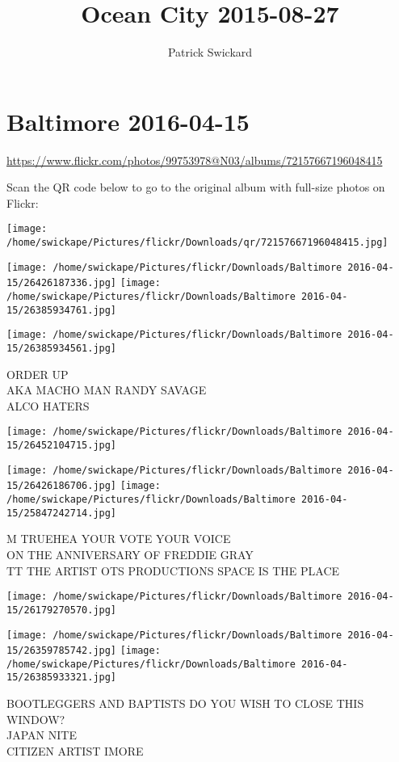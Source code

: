 \documentclass[10pt,letterpaper]{article}
\title{Ocean City 2015-08-27}
\author{Patrick Swickard}
\date{}
\begin{document}
\section*{Baltimore 2016-04-15}

\url{https://www.flickr.com/photos/99753978@N03/albums/72157667196048415}

Scan the QR code below to go to the original album with full-size photos on Flickr:

\texttt{[image: /home/swickape/Pictures/flickr/Downloads/qr/72157667196048415.jpg]}
\pagebreak

\texttt{[image: /home/swickape/Pictures/flickr/Downloads/Baltimore 2016-04-15/26426187336.jpg]}
\texttt{[image: /home/swickape/Pictures/flickr/Downloads/Baltimore 2016-04-15/26385934761.jpg]}

\texttt{[image: /home/swickape/Pictures/flickr/Downloads/Baltimore 2016-04-15/26385934561.jpg]}

ORDER UP\\
AKA MACHO MAN RANDY SAVAGE\\
ALCO HATERS
\pagebreak

\texttt{[image: /home/swickape/Pictures/flickr/Downloads/Baltimore 2016-04-15/26452104715.jpg]}

\vspace{0.25in}
\texttt{[image: /home/swickape/Pictures/flickr/Downloads/Baltimore 2016-04-15/26426186706.jpg]}
\texttt{[image: /home/swickape/Pictures/flickr/Downloads/Baltimore 2016-04-15/25847242714.jpg]}

M TRUEHEA YOUR VOTE YOUR VOICE\\
ON THE ANNIVERSARY OF FREDDIE GRAY\\
TT THE ARTIST OTS PRODUCTIONS SPACE IS THE PLACE
\pagebreak

\texttt{[image: /home/swickape/Pictures/flickr/Downloads/Baltimore 2016-04-15/26179270570.jpg]}

\vspace{0.25in}
\texttt{[image: /home/swickape/Pictures/flickr/Downloads/Baltimore 2016-04-15/26359785742.jpg]}
\texttt{[image: /home/swickape/Pictures/flickr/Downloads/Baltimore 2016-04-15/26385933321.jpg]}

BOOTLEGGERS AND BAPTISTS DO YOU WISH TO CLOSE THIS WINDOW?\\
JAPAN NITE\\
CITIZEN ARTIST IMORE
\pagebreak
\end{document}
